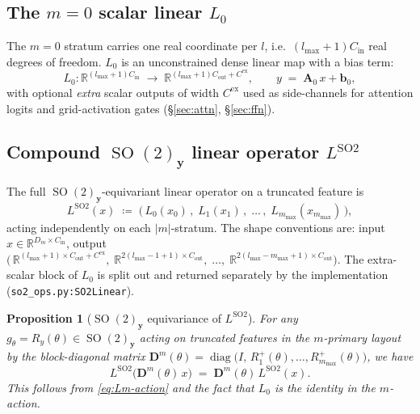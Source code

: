 \documentclass[11pt,a4paper]{article}
\DeclareMathOperator{\SO}{SO}
\DeclareMathOperator{\diag}{diag}
\newcommand{\R}{\mathbb{R}}
\newcommand{\bA}{\bm{A}}
\newcommand{\by}{\bm{y}}
\newcommand{\bD}{\bm{D}}
\newcommand{\lmax}{l_{\max}}
\newcommand{\mmax}{m_{\max}}
\theoremstyle{plain}
\newtheorem{proposition}[theorem]{Proposition}
\theoremstyle{definition}
\theoremstyle{remark}
\begin{document}
\subsection{\texorpdfstring{The $m=0$ scalar linear $L_0$}{The m=0 scalar linear L\_0}}\label{sec:L0}

The $m=0$ stratum carries one real coordinate per $l$, i.e.\
$(\lmax+1)C_{\mathrm{in}}$ real degrees of freedom. $L_0$ is an unconstrained
dense linear map with a bias term:
\begin{equation}\label{eq:L0}
    L_0\colon\R^{(\lmax+1)C_{\mathrm{in}}}\;\to\;\R^{(\lmax+1)C_{\mathrm{out}}+C^{\mathrm{ex}}},\qquad
    y\;=\;\bA_0\,x+\bm{b}_0,
\end{equation}
with optional \emph{extra} scalar outputs of width $C^{\mathrm{ex}}$ used as side-channels for attention logits and grid-activation gates (\S\ref{sec:attn}, \S\ref{sec:ffn}).

\subsection{\texorpdfstring{Compound $\SO(2)_{\by}$ linear operator $L^{\mathrm{SO2}}$}{Compound SO(2)\_y linear operator}}\label{sec:Lso2}

The full $\SO(2)_{\by}$-equivariant linear operator on a truncated feature is
\begin{equation}\label{eq:LSO2}
    L^{\mathrm{SO2}}(x)\;\coloneqq\;\bigl(\,L_0(x_0)\,,\;L_1(x_1)\,,\;\dots\,,\;L_{\mmax}(x_{\mmax})\,\bigr),
\end{equation}
acting independently on each $|m|$-stratum.
The shape conventions are: input $x\in\R^{D_m\times C_{\mathrm{in}}}$, output $\bigl(\,\R^{(\lmax+1)\times C_{\mathrm{out}}+C^{\mathrm{ex}}},\;\R^{2(\lmax-1+1)\times C_{\mathrm{out}}},\;\dots,\;\R^{2(\lmax-\mmax+1)\times C_{\mathrm{out}}}\bigr)$.
The extra-scalar block of $L_0$ is split out and returned separately by the implementation (\texttt{so2\_ops.py:SO2Linear}).

\begin{proposition}[$\SO(2)_{\by}$ equivariance of $L^{\mathrm{SO2}}$]\label{prop:Lso2}
    For any $g_\theta=R_y(\theta)\in\SO(2)_{\by}$ acting on truncated features in the $m$-primary layout by the block-diagonal matrix $\bD^m(\theta)=\diag\bigl(I,\,R^+_1(\theta),\dots,R^+_{\mmax}(\theta)\bigr)$, we have
    \begin{equation}\label{eq:LSO2-equiv}
        L^{\mathrm{SO2}}\bigl(\bD^m(\theta)\,x\bigr)\;=\;\bD^m(\theta)\,L^{\mathrm{SO2}}(x).
    \end{equation}
    This follows from \eqref{eq:Lm-action} and the fact that $L_0$ is the identity in the $m$-action.
\end{proposition}
\end{document}
